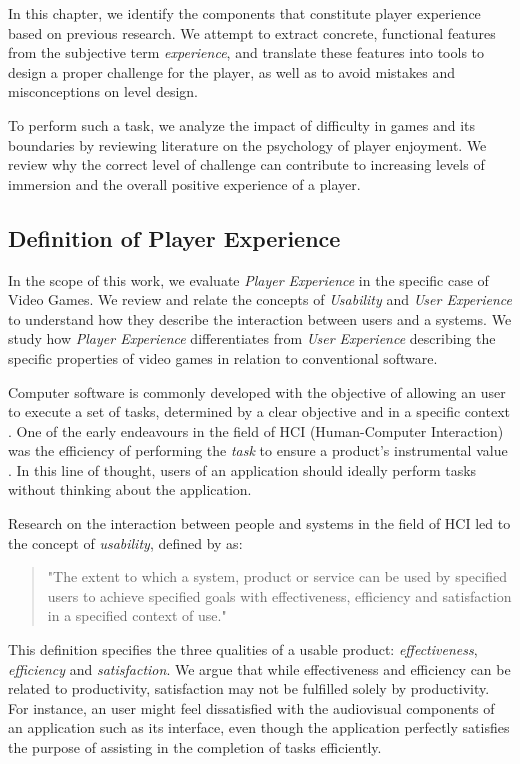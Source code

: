 \documentclass[cic,tc,english]{iiufrgs}
\begin{document}
In this chapter, we identify the components that constitute player experience based on previous research. We attempt to extract concrete, functional features from the subjective term \emph{experience}, and translate these features into tools to design a proper challenge for the player, as well as to avoid mistakes and misconceptions on level design.

To perform such a task, we analyze the impact of difficulty in games and its boundaries by reviewing literature on the psychology of player enjoyment. We review why the correct level of challenge can contribute to increasing levels of immersion and the overall positive experience of a player.

\subsection{Definition of Player Experience}

In the scope of this work, we evaluate \emph{Player Experience} in the specific case of Video Games. We review and relate the concepts of \emph{Usability} and \emph{User Experience} to understand how they describe the interaction between users and a systems. We study how \emph{Player Experience} differentiates from \emph{User Experience} describing the specific properties of video games in relation to conventional software.

Computer software is commonly developed with the objective of allowing an user to execute a set of tasks, determined by a clear objective and in a specific context \cite{ARTICLE_FromUsabilityToPlayability}. One of the early endeavours in the field of HCI (Human-Computer Interaction) was the efficiency of performing the \emph{task} to ensure a product's instrumental value \cite{ARTICLE_UserExperienceAResearchAgenda}.  In this line of thought, users of an application should ideally perform tasks without thinking about the application. 

Research on the interaction between people and systems in the field of HCI led to the concept of \emph{usability}, defined by \cite{ISO_ISO92411} as:

\begin{quotation}
"The extent to which a system, product or service can be used by specified users to achieve specified goals with effectiveness, efficiency and satisfaction in a specified context of use."
\end{quotation}

This definition specifies the three qualities of a usable product: \emph{effectiveness}, \emph{efficiency} and \emph{satisfaction}. We argue that while effectiveness and efficiency can be related to productivity,  satisfaction may not be fulfilled solely by productivity. For instance, an user might feel dissatisfied with the audiovisual components of an application such as its interface, even though the application perfectly satisfies the purpose of assisting in the completion of tasks efficiently.
\end{document}
